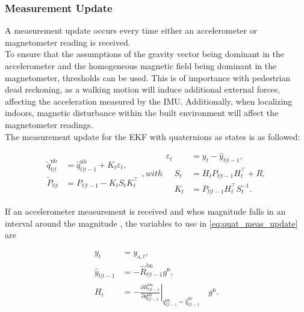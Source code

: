 \subsubsection{Measurement Update}

A measurement update occurs every time either an accelerometer or magnetometer reading is received. \\
To ensure that the assumptions of the gravity vector being dominant in the accelerometer and the homogeneous magnetic field being dominant in the magnetometer, thresholds can be used. This is of importance with pedestrian dead reckoning, as a walking motion will induce additional external forces, affecting the acceleration measured by the IMU. Additionally, when localizing indoors, magnetic disturbance within the built environment will affect the magnetometer readings.\\
The measurement update for the EKF with quaternions as states is as followed:

\begin{subequations}
	\begin{align}
	\tilde{q}_{t | t}^{\mathrm{nb}} &=\hat{q}_{t | t-1}^{\mathrm{nb}}+K_{t} \varepsilon_{t}, \\
	\tilde{P}_{t | t} &=P_{t | t-1}-K_{t} S_{t} K_{t}^{\top}
	\end{align},
	with	
	\begin{align}
	\varepsilon_{t} &= y_{t}-\hat{y}_{t | t-1},\\
	\quad S_{t} &= H_{t} P_{t | t-1} H_{t}^{\top}+R, \\
	\quad K_{t} &= P_{t | t-1} H_{t}^{\top} S_{t}^{-1}.
	\end{align}
\label{eq:quat_meas_update}	
\end{subequations}


If an accelerometer measurement is received and whos magnitude falls in an interval around the magnitude , the variables to use in \cref{eq:quat_meas_update} are

\begin{subequations}
	\begin{align}
	y_{t}&=
	y_{\mathrm{a}, t}, \\
	\hat{y}_{t | t-1}&=
	-\hat{R}_{t | t-1}^{\mathrm{bn}} g^{\mathrm{n}},\\
	H_{t}&=	-\left.\frac{\partial R_{t | t-1}^{\mathrm{bn}}}{\partial q_{t | t-1}^{\mathrm{nb}}}\right|_{{q_{t | t-1}^{\mathrm{nb}}}=\hat{q}_{t | t-1}^{\mathrm{nb}}} \quad g^{\mathrm{n}}.
	\end{align}
\end{subequations}

